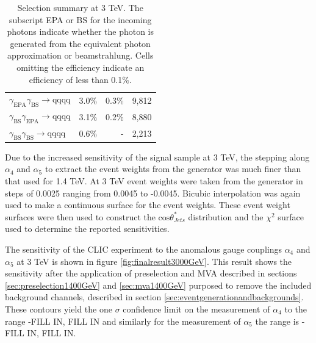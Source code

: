 \begin{table}[h!]
\begin{tabular}{ l r r r }
$\gamma_{\text{EPA}}\gamma_{\text{BS}} \rightarrow \text{qqqq}$ & 3.0\% & 0.3\% & 9,812 \\
$\gamma_{\text{BS}}\gamma_{\text{EPA}} \rightarrow \text{qqqq}$ & 3.1\% & 0.2\% & 8,880 \\
$\gamma_{\text{BS}}\gamma_{\text{BS}} \rightarrow \text{qqqq}$ & 0.6\% & - & 2,213 \\
\hline
\end{tabular}
\caption[Selection summary at 3 TeV.]{Selection summary at 3 TeV.   The subscript EPA or BS for the incoming photons indicate whether the photon is generated from the equivalent photon approximation or beamstrahlung.  Cells omitting the efficiency indicate an efficiency of less than 0.1\%.}
\label{table:selectionsummary3000GeV}
\end{table}

Due to the increased sensitivity of the signal sample at 3 TeV, the stepping along $\alpha_{4}$ and $\alpha_{5}$ to extract the event weights from the generator was much finer than that used for 1.4 TeV.  At 3 TeV event weights were taken from the generator in steps of 0.0025 ranging from 0.0045 to -0.0045.  Bicubic interpolation was again used to make a continuous surface for the event weights.  These event weight surfaces were then used to construct the $\text{cos}\theta^{*}_{Jets}$ distribution and the $\chi^{2}$ surface used to determine the reported sensitivities.

The sensitivity of the CLIC experiment to the anomalous gauge couplings $\alpha_{4}$ and $\alpha_{5}$ at 3 TeV is shown in figure \ref{fig:finalresult3000GeV}.  This result shows the sensitivity after the application of preselection and MVA described in sections \ref{sec:preselection1400GeV} and \ref{sec:mva1400GeV} purposed to remove the included background channels, described in section \ref{sec:eventgenerationandbackgrounds}.  These contours yield the one $\sigma$ confidence limit on the measurement of $\alpha_{4}$ to the range -FILL IN, FILL IN and similarly for the measurement of $\alpha_{5}$ the range is -FILL IN, FILL IN.

